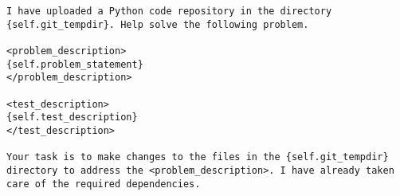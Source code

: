 \begin{lstlisting}
I have uploaded a Python code repository in the directory {self.git_tempdir}. Help solve the following problem.

<problem_description>
{self.problem_statement}
</problem_description>

<test_description>
{self.test_description}
</test_description>

Your task is to make changes to the files in the {self.git_tempdir} directory to address the <problem_description>. I have already taken care of the required dependencies.
\end{lstlisting}
